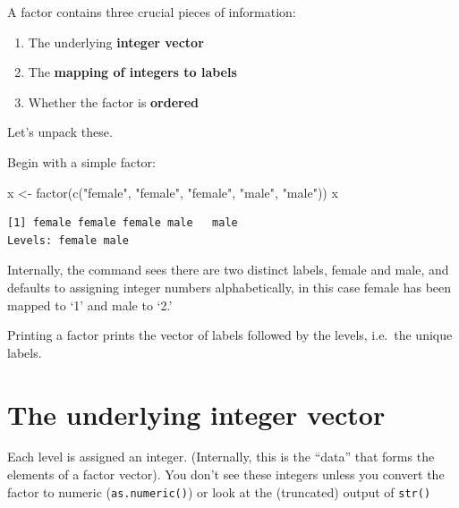 \documentclass[
]{book}
\newenvironment{Shaded}{\begin{snugshade}}{\end{snugshade}}
\newcommand{\FunctionTok}[1]{\textcolor[rgb]{0.00,0.00,0.00}{#1}}
\newcommand{\NormalTok}[1]{#1}
\newcommand{\OtherTok}[1]{\textcolor[rgb]{0.56,0.35,0.01}{#1}}
\newcommand{\StringTok}[1]{\textcolor[rgb]{0.31,0.60,0.02}{#1}}
\begin{document}
\begin{rmdnote}
A factor contains three crucial pieces of information:

\begin{enumerate}
\def\labelenumi{\arabic{enumi}.}
\item
  The underlying \textbf{integer vector}
\item
  The \textbf{mapping of integers to labels}
\item
  Whether the factor is \textbf{ordered}
\end{enumerate}
\end{rmdnote}

Let's unpack these.

Begin with a simple factor:

\begin{Shaded}
\begin{Highlighting}[]
\NormalTok{x }\OtherTok{\textless{}{-}} \FunctionTok{factor}\NormalTok{(}\FunctionTok{c}\NormalTok{(}\StringTok{"female"}\NormalTok{, }\StringTok{"female"}\NormalTok{, }\StringTok{"female"}\NormalTok{, }\StringTok{"male"}\NormalTok{, }\StringTok{"male"}\NormalTok{))}
\NormalTok{x}
\end{Highlighting}
\end{Shaded}

\begin{verbatim}
[1] female female female male   male  
Levels: female male
\end{verbatim}

Internally, the command sees there are two distinct labels, female and male, and defaults to assigning integer numbers alphabetically, in this case female has been mapped to `1' and male to `2.'

Printing a factor prints the vector of labels followed by the levels, i.e.~the unique labels.

\hypertarget{the-underlying-integer-vector}{%
\section{\texorpdfstring{The underlying \textbf{integer vector}}{The underlying integer vector}}\label{the-underlying-integer-vector}}

Each level is assigned an integer. (Internally, this is the ``data'' that forms the elements of a factor vector). You don't see these integers unless you convert the factor to numeric (\texttt{as.numeric()}) or look at the (truncated) output of \texttt{str()}
\end{document}
